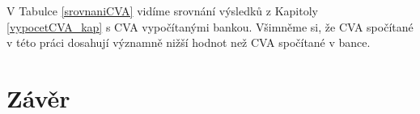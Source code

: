 \documentclass[a4paper,12pt]{report}
\theoremstyle{definition} \newtheorem{definice}[veta]{Definice}
\theoremstyle{remark}
\begin{document}
V Tabulce \ref{srovnaniCVA} vidíme srovnání výsledků z Kapitoly \ref{vypocetCVA_kap} s CVA vypočítanými bankou. 
Všimněme si, že CVA spočítané v této práci dosahují významně nižší hodnot než CVA spočítané v bance.
\begin{table}%
  \centering 
\caption{Srovnání výsledků výpočtů CVA dle metody popsané v této práci a dle metody používané v bance}
\label{srovnaniCVA}
\vspace{5mm}
\end{table}

\chapter*{Závěr} 




\nocite{}  %

\cleardoublepage
{} 

%
%



\end{document}
